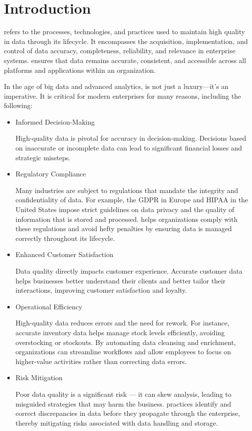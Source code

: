 \chapter*{Introduction}

 refers to the processes, technologies, and practices used to maintain high quality in data through its lifecycle. It encompasses the acquisition, implementation, and control of data accuracy, completeness, reliability, and relevance in enterprise systems.  ensures that data remains accurate, consistent, and accessible across all platforms and applications within an organization.

In the age of big data and advanced analytics,  is not just a luxury—it's an imperative. It is critical for modern enterprises for many reasons, including the following:

\begin{itemize}
\item Informed Decision-Making

High-quality data is pivotal for accuracy in decision-making. Decisions based on inaccurate or incomplete data can lead to significant financial losses and strategic missteps.

\item Regulatory Compliance

Many industries are subject to regulations that mandate the integrity and confidentiality of data. For example, the GDPR in Europe and HIPAA in the United States impose strict guidelines on data privacy and the quality of information that is stored and processed.
     helps organizations comply with these regulations and avoid hefty penalties by ensuring data is managed correctly throughout its lifecycle.

\item Enhanced Customer Satisfaction

Data quality directly impacts customer experience. Accurate customer data helps businesses better understand their clients and better tailor their interactions, improving customer satisfaction and loyalty.

\item Operational Efficiency

High-quality data reduces errors and the need for rework. For instance, accurate inventory data helps manage stock levels efficiently, avoiding overstocking or stockouts.
By automating data cleansing and enrichment, organizations can streamline workflows and allow employees to focus on higher-value activities rather than correcting data errors.    

\item Risk Mitigation

Poor data quality is a significant risk — it can skew analysis, leading to misguided strategies that may harm the business.
 practices identify and correct discrepancies in data before they propagate through the enterprise, thereby mitigating risks associated with data handling and storage.
\end{itemize}


